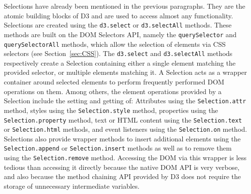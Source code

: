 Selections have already been mentioned in the previous paragraphs.
They are the atomic building blocks of D3 and are used to access
almost any functionality.  Selections are created using the
\lstinline{d3.select} or \lstinline{d3.selectAll} methods.  These
methods are built on the DOM Selectors API, namely the
\lstinline{querySelector} and \lstinline{querySelectorAll} methods,
which allow the selection of elements via CSS selectors (see
Section~\ref{sec:CSS}).  The \lstinline{d3.select} and
\lstinline{d3.selectAll} methods respectively create a Selection
containing either a single element matching the provided selector, or
multiple elements matching it.  A Selection acts as a wrapper
container around selected elements to perform frequently performed DOM
operations on them.  Among others, the element operations provided by
a Selection include the setting and getting of: Attributes using the
\lstinline{Selection.attr} method, styles using the
\lstinline{Selection.style} method, properties using the
\lstinline{Selection.property} method, text or HTML content using the
\lstinline{Selection.text} or \lstinline{Selection.html} methods, and
event listeners using the \lstinline{Selection.on} method.  Selections
also provide wrapper methods to insert additional elements using the
\lstinline{Selection.append} or \lstinline{Selection.insert} methods
as well as to remove them using the \lstinline{Selection.remove}
method.  Accessing the DOM via this wrapper is less tedious than
accessing it directly because the native DOM API is very verbose, and
also because the method chaining API provided by D3 does not require
the storage of unnecessary intermediate variables.

